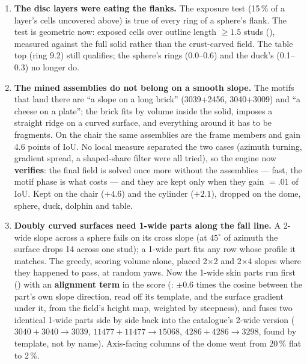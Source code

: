 \begin{enumerate}
\item \textbf{The disc layers were eating the flanks.} The exposure test (15\,\% of a layer's cells uncovered above) is true
  of every ring of a sphere's flank. The test is geometric now: exposed cells over outline length $\ge 1.5$ studs
  (), measured against the full solid rather than the crust-carved field. The table top (ring 9.2) still
  qualifies; the sphere's rings (0.0--0.6) and the duck's (0.1--0.3) no longer do.
\item \textbf{The mined assemblies do not belong on a smooth slope.} The motifs that land there are ``a slope on a long brick''
  (3039+2456, 3040+3009) and ``a cheese on a plate''; the brick fits by volume inside the solid, imposes a straight ridge on a
  curved surface, and everything around it has to be fragments. On the chair the same assemblies are the frame members and gain
  4.6 points of IoU. No local measure separated the two cases (azimuth turning, gradient spread, a shaped-share filter were all
  tried), so the engine now \textbf{verifies}: the final field is solved once more without the assemblies --- fast, the motif phase
  is what costs --- and they are kept only when they gain  $=.01$ of IoU. Kept on the chair ($+4.6$) and the
  cylinder ($+2.1$), dropped on the dome, sphere, duck, dolphin and table.
\item \textbf{Doubly curved surfaces need 1-wide parts along the fall line.} A 2-wide slope across a sphere fails on its cross
  slope (at $45^\circ$ of azimuth the surface drops 14\ldu{} across one stud); a 1-wide part fits any row whose profile it
  matches. The greedy, scoring volume alone, placed 2$\times$2 and 2$\times$4 slopes where they happened to pass, at random yaws.
  Now the 1-wide skin parts run first () with an \textbf{alignment term} in the score (:
  $\pm 0.6$ times the cosine between the part's own slope direction, read off its template, and the surface gradient under it,
  from the field's height map, weighted by steepness), and  fuses two identical 1-wide parts side by side back
  into the catalogue's 2-wide version ($3040+3040 \to 3039$, $11477+11477 \to 15068$, $4286+4286 \to 3298$, found by template,
  not by name). Axis-facing columns of the dome went from 20\,\% flat to 2\,\%.
\end{enumerate}

